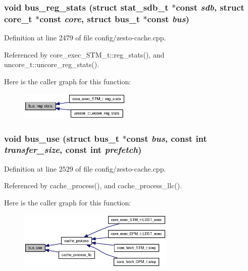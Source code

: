 \subsubsection[{bus\_\-reg\_\-stats}]{\setlength{\rightskip}{0pt plus 5cm}void bus\_\-reg\_\-stats (struct {\bf stat\_\-sdb\_\-t} $\ast$const  {\em sdb}, \/  struct {\bf core\_\-t} $\ast$const  {\em core}, \/  struct {\bf bus\_\-t} $\ast$const  {\em bus})}\label{config_2zesto-cache_8cpp_22d7e9c4a1a2031601e5a3ad3694768c}




Definition at line 2479 of file config/zesto-cache.cpp.

Referenced by core\_\-exec\_\-STM\_\-t::reg\_\-stats(), and uncore\_\-t::uncore\_\-reg\_\-stats().

Here is the caller graph for this function:\nopagebreak
\begin{figure}[H]
\begin{center}
\leavevmode
\includegraphics[width=150pt]{config_2zesto-cache_8cpp_22d7e9c4a1a2031601e5a3ad3694768c_icgraph}
\end{center}
\end{figure}
\subsubsection[{bus\_\-use}]{\setlength{\rightskip}{0pt plus 5cm}void bus\_\-use (struct {\bf bus\_\-t} $\ast$const  {\em bus}, \/  const int {\em transfer\_\-size}, \/  const int {\em prefetch})}\label{config_2zesto-cache_8cpp_cb6440bff7b9405665cbae0d836630f3}




Definition at line 2529 of file config/zesto-cache.cpp.

Referenced by cache\_\-process(), and cache\_\-process\_\-llc().

Here is the caller graph for this function:\nopagebreak
\begin{figure}[H]
\begin{center}
\leavevmode
\includegraphics[width=211pt]{config_2zesto-cache_8cpp_cb6440bff7b9405665cbae0d836630f3_icgraph}
\end{center}
\end{figure}
